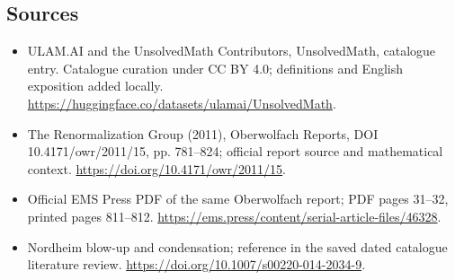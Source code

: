 \documentclass[11pt]{article}
\begin{document}
\subsection{Sources}
\begin{itemize}
\item[\hypertarget{source:statement:1}{S1}] ULAM.AI and the UnsolvedMath Contributors, UnsolvedMath, catalogue entry. Catalogue curation under CC BY 4.0; definitions and English exposition added locally.
\url{https://huggingface.co/datasets/ulamai/UnsolvedMath}.
\item[\hypertarget{source:statement:2}{S2}] The Renormalization Group (2011), Oberwolfach Reports, DOI 10.4171/owr/2011/15, pp. 781--824; official report source and mathematical context.
\url{https://doi.org/10.4171/owr/2011/15}.
\item[\hypertarget{source:statement:3}{S3}] Official EMS Press PDF of the same Oberwolfach report; PDF pages 31--32, printed pages 811--812.
\url{https://ems.press/content/serial-article-files/46328}.
\item[\hypertarget{source:statement:4}{S4}] Nordheim blow-up and condensation; reference in the saved dated catalogue literature review.
\url{https://doi.org/10.1007/s00220-014-2034-9}.
\end{itemize}
\label{end:statement}
\end{document}
